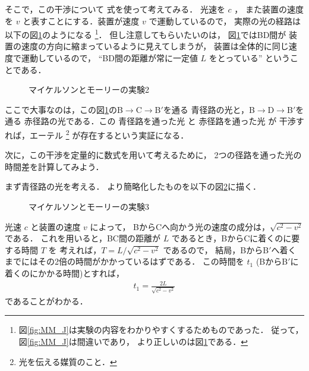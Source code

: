             そこで，この干渉について
            式を使って考えてみる．
            光速を $c$ ，
            また装置の速度を $v$ と表すことにする．装置が速度 $v$ で運動しているので，
            実際の光の経路は以下の図\ref{fig:MM_J2}のようになる
                \footnote{
                    図\ref{fig:MM_J}は実験の内容をわかりやすくするためものであった．
                            従って，図\ref{fig:MM_J}は間違いであり，
                            より正しいのは図\ref{fig:MM_J2}である．
                }．
            但し注意してもらいたいのは，
            図\ref{fig:MM_J2}ではBD間が
            装置の速度の方向に縮まっているように見えてしまうが，
            装置は全体的に同じ速度で運動しているので，
            “BD間の距離が常に一定値 $L$ をとっている”
            ということである．
            \begin{figure}[hbt]
                \begin{center}
                    \caption{マイケルソンとモーリーの実験2}
                    \label{fig:MM_J2}
                \end{center}
            \end{figure}

            ここで大事なのは，この図\ref{fig:MM_J2}のB$\rightarrow$C$\rightarrow$B$'$を通る
            青径路の光と，B$\rightarrow$D$\rightarrow$B$'$を通る
            赤径路の光である．この 青径路を通った光 と 赤径路を通った光 が
            干渉すれば，エーテル
                \footnote{
                    光を伝える媒質のこと．
                }
            が存在するという実証になる．

            次に，この干渉を定量的に数式を用いて考えるために，
            2つの径路を通った光の時間差を計算してみよう．

            まず青径路の光を考える．
            より簡略化したものを以下の図\ref{fig:MM_J3}に描く．
                \begin{figure}[hbt]
                    \begin{center}
                        \caption{マイケルソンとモーリーの実験3}
                        \label{fig:MM_J3}
                    \end{center}
                \end{figure}

            光速 $c$ と装置の速度 $v$ によって，
            BからCへ向かう光の速度の成分は，$\sqrt{c^{2}-v^{2}}$ である．
            これを用いると，BC間の距離が $L$ であるとき，BからCに着くのに要する時間 $T$ を
            考えれば，$T=L/\sqrt{c^{2}-v^{2}}$ であるので，
            結局，BからB$'$へ着くまでにはその2倍の時間がかかっているはずである．
            この時間を $t_{1}$ (BからB$'$に着くのにかかる時間)とすれば，
                \begin{align}\label{eq:MM1}
                    t_{1}=\frac{2L}{\sqrt{c^{2}-v^{2}}}
                \end{align}
            であることがわかる．

